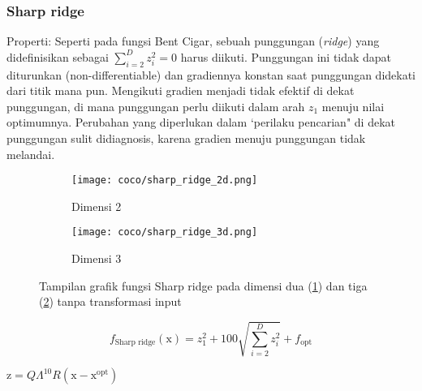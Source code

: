 \subsubsection{Sharp ridge}
\noindent Properti:
Seperti pada fungsi Bent Cigar, sebuah punggungan (\textit{ridge}) yang didefinisikan sebagai $\sum_{i=2}^{D}z_i^2= 0$ harus diikuti. Punggungan ini tidak dapat diturunkan (non-differentiable) dan gradiennya konstan saat punggungan didekati dari titik mana pun. Mengikuti gradien menjadi tidak efektif di dekat punggungan, di mana punggungan perlu diikuti dalam arah $z_1$ menuju nilai optimumnya. Perubahan yang diperlukan dalam `perilaku pencarian" di dekat punggungan sulit didiagnosis, karena gradien menuju punggungan tidak melandai.
\begin{figure}[H]
	\centering
	\begin{subfigure}[b]{0.4\textwidth}
		\centering
		\texttt{[image: coco/sharp\_ridge\_2d.png]}
		\caption{Dimensi 2}
		\label{fig:sharp_ridge_2d}
	\end{subfigure}
	\hfill
	\begin{subfigure}[b]{0.4\textwidth}
		\centering
		\texttt{[image: coco/sharp\_ridge\_3d.png]}
		\caption{Dimensi 3}
		\label{fig:sharp_ridge_3d}
	\end{subfigure}
	\caption{Tampilan grafik fungsi Sharp ridge pada dimensi dua (\cref{fig:sharp_ridge_2d}) dan tiga (\cref{fig:sharp_ridge_3d}) tanpa transformasi input}
	\label{fig:sharp_ridge}
\end{figure}
\begin{equation}
  f_{\text{Sharp ridge}}(\mathrm{x})=z_1^2+100\sqrt{\sum_{i=2}^{D}z_i^2}+f_{\text{opt}}
\end{equation}
\begin{packed_item}
    \item $\mathrm{z}=Q\Lambda^{10}R(\mathrm{x}-\mathrm{x}^{\text{opt}})$
\end{packed_item}

